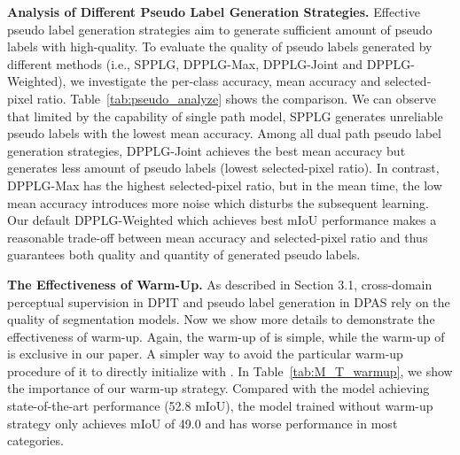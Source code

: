 \documentclass[10pt,twocolumn,letterpaper]{article}
\begin{document}
{\noindent \textbf{Analysis of Different Pseudo Label Generation Strategies.}}\hspace{3pt}
Effective pseudo label generation strategies aim to generate sufficient amount of pseudo labels with high-quality. To evaluate the quality of pseudo labels generated by different methods (i.e., SPPLG, DPPLG-Max, DPPLG-Joint and DPPLG-Weighted), we investigate the per-class accuracy, mean accuracy and selected-pixel ratio. Table~\ref{tab:pseudo_analyze} shows the comparison. We can observe that limited by the capability of single path model, SPPLG generates unreliable pseudo labels with the lowest mean accuracy. Among all dual path pseudo label generation strategies, DPPLG-Joint achieves the best mean accuracy but generates less amount of pseudo labels (lowest selected-pixel ratio). In contrast, DPPLG-Max has the highest selected-pixel ratio, but in the mean time, the low mean accuracy introduces more noise which disturbs the subsequent learning. Our default DPPLG-Weighted which achieves best mIoU performance makes a reasonable trade-off between mean accuracy and selected-pixel ratio and thus guarantees both quality and quantity of generated pseudo labels.


{\noindent \textbf{The Effectiveness of \boldsymbol{} Warm-Up.}}\hspace{3pt}
As described in Section 3.1, cross-domain perceptual supervision in DPIT and pseudo label generation in DPAS rely on the quality of segmentation models. Now we show more details to demonstrate the effectiveness of  warm-up. Again, the warm-up of  is simple, while the warm-up of  is exclusive in our paper. A simpler way to avoid the particular warm-up procedure of  it to directly initialize  with . In Table~\ref{tab:M_T_warmup}, we show the importance of our warm-up strategy. Compared with the model achieving state-of-the-art performance (52.8 mIoU), the model trained without  warm-up strategy only achieves mIoU of 49.0 and has worse performance in most categories.
\end{document}
